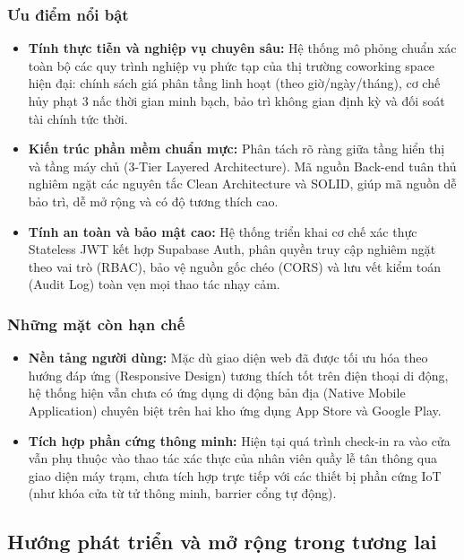 \subsubsection{Ưu điểm nổi bật}
\begin{itemize}
    \item \textbf{Tính thực tiễn và nghiệp vụ chuyên sâu:} Hệ thống mô phỏng chuẩn xác toàn bộ các quy trình nghiệp vụ phức tạp của thị trường coworking space hiện đại: chính sách giá phân tầng linh hoạt (theo giờ/ngày/tháng), cơ chế hủy phạt 3 nấc thời gian minh bạch, bảo trì không gian định kỳ và đối soát tài chính tức thời.
    \item \textbf{Kiến trúc phần mềm chuẩn mực:} Phân tách rõ ràng giữa tầng hiển thị và tầng máy chủ (3-Tier Layered Architecture). Mã nguồn Back-end tuân thủ nghiêm ngặt các nguyên tắc Clean Architecture và SOLID, giúp mã nguồn dễ bảo trì, dễ mở rộng và có độ tương thích cao.
    \item \textbf{Tính an toàn và bảo mật cao:} Hệ thống triển khai cơ chế xác thực Stateless JWT kết hợp Supabase Auth, phân quyền truy cập nghiêm ngặt theo vai trò (RBAC), bảo vệ nguồn gốc chéo (CORS) và lưu vết kiểm toán (Audit Log) toàn vẹn mọi thao tác nhạy cảm.
\end{itemize}

\subsubsection{Những mặt còn hạn chế}
\begin{itemize}
    \item \textbf{Nền tảng người dùng:} Mặc dù giao diện web đã được tối ưu hóa theo hướng đáp ứng (Responsive Design) tương thích tốt trên điện thoại di động, hệ thống hiện vẫn chưa có ứng dụng di động bản địa (Native Mobile Application) chuyên biệt trên hai kho ứng dụng App Store và Google Play.
    \item \textbf{Tích hợp phần cứng thông minh:} Hiện tại quá trình check-in ra vào cửa vẫn phụ thuộc vào thao tác xác thực của nhân viên quầy lễ tân thông qua giao diện máy trạm, chưa tích hợp trực tiếp với các thiết bị phần cứng IoT (như khóa cửa từ tử thông minh, barrier cổng tự động).
\end{itemize}

\subsection{Hướng phát triển và mở rộng trong tương lai}


